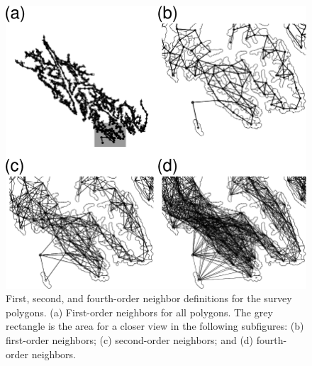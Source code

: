 \documentclass[11pt, titlepage]{article}\usepackage[]{graphicx}\usepackage[]{color}
\begin{document}
\begin{spacing}{1.9}
\begin{flushleft}
\begin{figure}[H]
  \begin{center}
  \includegraphics[width=\linewidth]{figure/Fig-Neighbors.png}
  \end{center}
  \caption{First, second, and fourth-order neighbor definitions for the survey polygons. (a) First-order neighbors for all polygons.  The grey rectangle is the area for a closer view in the following subfigures: (b) first-order neighbors; (c) second-order neighbors; and (d) fourth-order neighbors. \label{Fig-Neighbors}}     
\end{figure}





\end{flushleft}
\end{spacing}
\end{document}
